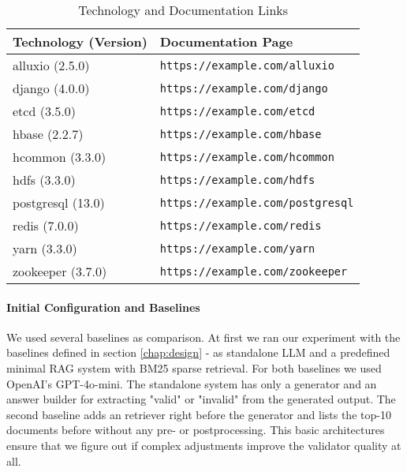 \begin{table}[h]
    \centering
    \begin{tabular}{|l|l|}
        \hline
        \textbf{Technology (Version)} & \textbf{Documentation Page} \\
        \hline
        alluxio (2.5.0) & \texttt{https://example.com/alluxio} \\
        django (4.0.0) & \texttt{https://example.com/django} \\
        etcd (3.5.0) & \texttt{https://example.com/etcd} \\
        hbase (2.2.7) & \texttt{https://example.com/hbase} \\
        hcommon (3.3.0) & \texttt{https://example.com/hcommon} \\
        hdfs (3.3.0) & \texttt{https://example.com/hdfs} \\
        postgresql (13.0) & \texttt{https://example.com/postgresql} \\
        redis (7.0.0) & \texttt{https://example.com/redis} \\
        yarn (3.3.0) & \texttt{https://example.com/yarn} \\
        zookeeper (3.7.0) & \texttt{https://example.com/zookeeper} \\
        \hline
    \end{tabular}
    \caption{Technology and Documentation Links}
    \label{tab:technology_documentation}
\end{table}

\paragraph{Initial Configuration and Baselines} \label{sec:exp_initial_config}
We used several baselines as comparison. At first we ran our experiment with the baselines defined in section \ref{chap:design} - as standalone LLM and a predefined minimal RAG system with BM25 sparse retrieval. For both baselines we used OpenAI's GPT-4o-mini\cite{OpenAI_2022}. The standalone system has only a generator and an answer builder for extracting "valid" or "invalid" from the generated output. The second baseline adds an retriever right before the generator and lists the top-10 documents before without any pre- or postprocessing. This basic architectures ensure that we figure out if complex adjustments improve the validator quality at all.

